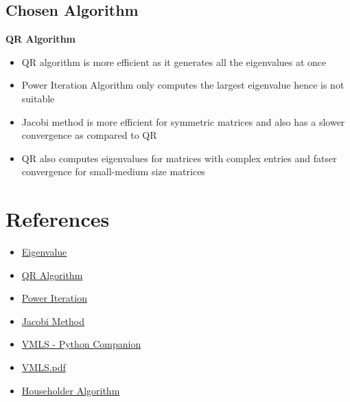 \documentclass[journal]{IEEEtran}
\begin{document}
\subsection{Chosen Algorithm}
\textbf{QR Algorithm}
\begin{itemize}
    \item QR algorithm is more efficient as it generates all the eigenvalues at once 
    \item Power Iteration Algorithm only computes the largest eigenvalue hence is not suitable
    \item Jacobi method is more efficient for symmetric matrices and also has a slower convergence as compared to QR
    \item QR also computes eigenvalues for matrices with complex entries and fatser convergence for small-medium size matrices   
\end{itemize}
\newpage
\section{References}
\begin{itemize}
    \item \href{https://en.wikipedia.org/wiki/Eigenvalues_and_eigenvectors}{Eigenvalue}\\
    \item \href{https://www.andreinc.net/2021/01/25/computing-eigenvalues-and-eigenvectors-using-qr-decomposition}{QR Algorithm}\\
    \item \href{https://en.wikipedia.org/wiki/Power_iteration}{Power Iteration}\\
    \item \href{https://en.wikipedia.org/wiki/Arnoldi_iteration}{Jacobi Method} \\ 
    \item \href{https://github.com/vbartle/VMLS-Companions.git}{VMLS - Python Companion}\\
    \item \href{https://web.stanford.edu/~boyd/vmls/vmls.pdf}{VMLS.pdf}\\
    \item \href{https://www.youtube.com/watch?v=d32WV1rKoVk}{Householder Algorithm}
\end{itemize}
\end{document}
